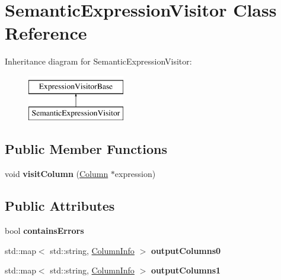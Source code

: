 \hypertarget{class_semantic_expression_visitor}{\section{Semantic\+Expression\+Visitor Class Reference}
\label{class_semantic_expression_visitor}
}
Inheritance diagram for Semantic\+Expression\+Visitor\+:\begin{figure}[H]
\begin{center}
\leavevmode
\includegraphics[height=2.000000cm]{class_semantic_expression_visitor}
\end{center}
\end{figure}
\subsection*{Public Member Functions}
\begin{DoxyCompactItemize}
\item 
\hypertarget{class_semantic_expression_visitor_a5a669aa8f4ff78ca0bfd3aab0a4d11d9}{void {\bfseries visit\+Column} (\hyperlink{class_column}{Column} $\ast$expression)}\label{class_semantic_expression_visitor_a5a669aa8f4ff78ca0bfd3aab0a4d11d9}

\end{DoxyCompactItemize}
\subsection*{Public Attributes}
\begin{DoxyCompactItemize}
\item 
\hypertarget{class_semantic_expression_visitor_a5355c2bd3477b4d33bc7ab5443408d11}{bool {\bfseries contains\+Errors}}\label{class_semantic_expression_visitor_a5355c2bd3477b4d33bc7ab5443408d11}

\item 
\hypertarget{class_semantic_expression_visitor_a38fc36443e4cabad8039ac58f9934780}{std\+::map$<$ std\+::string, \hyperlink{class_column_info}{Column\+Info} $>$ {\bfseries output\+Columns0}}\label{class_semantic_expression_visitor_a38fc36443e4cabad8039ac58f9934780}

\item 
\hypertarget{class_semantic_expression_visitor_aca4d42fbadc6310390ccdbe65a0356fd}{std\+::map$<$ std\+::string, \hyperlink{class_column_info}{Column\+Info} $>$ {\bfseries output\+Columns1}}\label{class_semantic_expression_visitor_aca4d42fbadc6310390ccdbe65a0356fd}

\end{DoxyCompactItemize}


